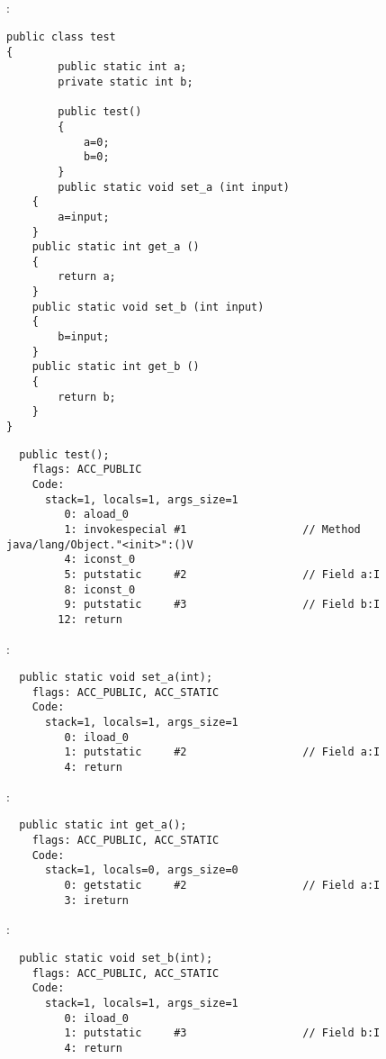 \subsection{}

:

\begin{lstlisting}[caption=test.java]
public class test
{
        public static int a;
        private static int b;

        public test()
        {
            a=0;
            b=0;
        }
        public static void set_a (int input)
	{
		a=input;
	}
	public static int get_a ()
	{
		return a;
	}
	public static void set_b (int input)
	{
		b=input;
	}
	public static int get_b ()
	{
		return b;
	}
}
\end{lstlisting}


\begin{lstlisting}
  public test();
    flags: ACC_PUBLIC
    Code:
      stack=1, locals=1, args_size=1
         0: aload_0       
         1: invokespecial #1                  // Method java/lang/Object."<init>":()V
         4: iconst_0      
         5: putstatic     #2                  // Field a:I
         8: iconst_0      
         9: putstatic     #3                  // Field b:I
        12: return        
\end{lstlisting}
        
 :

\begin{lstlisting}
  public static void set_a(int);
    flags: ACC_PUBLIC, ACC_STATIC
    Code:
      stack=1, locals=1, args_size=1
         0: iload_0       
         1: putstatic     #2                  // Field a:I
         4: return        
\end{lstlisting}

 :

\begin{lstlisting}
  public static int get_a();
    flags: ACC_PUBLIC, ACC_STATIC
    Code:
      stack=1, locals=0, args_size=0
         0: getstatic     #2                  // Field a:I
         3: ireturn       
\end{lstlisting}

 :

\begin{lstlisting}
  public static void set_b(int);
    flags: ACC_PUBLIC, ACC_STATIC
    Code:
      stack=1, locals=1, args_size=1
         0: iload_0       
         1: putstatic     #3                  // Field b:I
         4: return        
\end{lstlisting}

